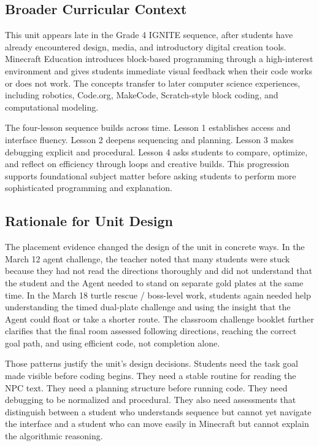 \documentclass[12pt]{article}
\begin{document}
\subsection{Broader Curricular Context}
This unit appears late in the Grade 4 IGNITE sequence, after students have already encountered design, media, and introductory digital creation tools. Minecraft Education introduces block-based programming through a high-interest environment and gives students immediate visual feedback when their code works or does not work. The concepts transfer to later computer science experiences, including robotics, Code.org, MakeCode, Scratch-style block coding, and computational modeling.

The four-lesson sequence builds across time. Lesson 1 establishes access and interface fluency. Lesson 2 deepens sequencing and planning. Lesson 3 makes debugging explicit and procedural. Lesson 4 asks students to compare, optimize, and reflect on efficiency through loops and creative builds. This progression supports foundational subject matter before asking students to perform more sophisticated programming and explanation.

\subsection{Rationale for Unit Design}
The placement evidence changed the design of the unit in concrete ways. In the March 12 agent challenge, the teacher noted that many students were stuck because they had not read the directions thoroughly and did not understand that the student and the Agent needed to stand on separate gold plates at the same time. In the March 18 turtle rescue / boss-level work, students again needed help understanding the timed dual-plate challenge and using the insight that the Agent could float or take a shorter route. The classroom challenge booklet further clarifies that the final room assessed following directions, reaching the correct goal path, and using efficient code, not completion alone.

Those patterns justify the unit's design decisions. Students need the task goal made visible before coding begins. They need a stable routine for reading the NPC text. They need a planning structure before running code. They need debugging to be normalized and procedural. They also need assessments that distinguish between a student who understands sequence but cannot yet navigate the interface and a student who can move easily in Minecraft but cannot explain the algorithmic reasoning.
\end{document}
